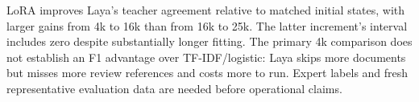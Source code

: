 LoRA improves Laya's teacher agreement relative to matched initial states, with larger gains from 4k to 16k than from 16k to 25k. The latter increment's interval includes zero despite substantially longer fitting. The primary 4k comparison does not establish an F1 advantage over TF-IDF/logistic: Laya skips more documents but misses more review references and costs more to run. Expert labels and fresh representative evaluation data are needed before operational claims.
